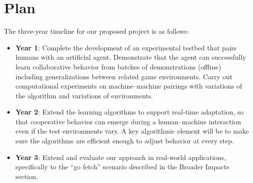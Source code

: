 
\section{Plan}

The three-year timeline for our proposed project is as follows:

\begin{itemize}
\item {\bf Year 1}: Complete the development of an experimental
  testbed that pairs humans with an artificial agent.  Demonstrate
  that the agent can successfully learn collaborative behavior from
  batches of demonstrations (offline) including generalizations
  between related game environments. Carry out computational
  experiments on machine--machine pairings with variations of the
  algorithm and variations of environments.

\item {\bf Year 2}: Extend the learning algorithms to support
  real-time adaptation, so that cooperative behavior can emerge during
  a human--machine interaction even if the test environments vary. A
  key algorithmic element will be to make sure the algorithms are
  efficient enough to adjust behavior at every step.

\item {\bf Year 3}: Extend and evaluate our approach in real-world
  applications, specifically to the ``go fetch'' scenario described in
  the Broader Impacts section. %

\end{itemize}


 

